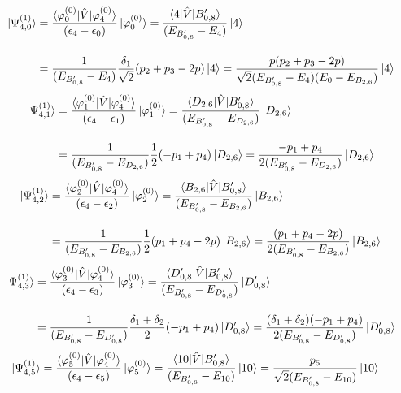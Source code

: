 \begin{align}
    \ket{\Psi_{4,0}^{(1)}}
     &=\frac{\braket{\varphi_{0
     }^{(0)}|\hat{V}|\varphi_{4}^{(0)}}}{(\epsilon_{4}-\epsilon_{0})}\ket{\varphi_{0}^{(0)}}
     =\frac{\braket{4|\hat{V}|B_{0,8}^{\prime}}}{(E_{B_{0,8}^{\prime}}-E_4)}\ket{4}
     \nn[10pt]
     &=
     \frac{1}{(E_{B_{0,8}^{\prime}}-E_4)}
     \frac{\delta_1}{\sqrt{2}}(p_2+p_3-2p)
     \ket{4}
     =
     \frac{p(p_2+p_3-2p)}{\sqrt{2}(E_{B_{0,8}^{\prime}}-E_4)(E_0-E_{B_{2,6}})}
     \ket{4}
\end{align}
\begin{align}
     \ket{\Psi_{4,1}^{(1)}}
     &=
     \frac{\braket{\varphi_{1
     }^{(0)}|\hat{V}|\varphi_{4}^{(0)}}}{(\epsilon_{4}-\epsilon_{1})}\ket{\varphi_{1}^{(0)}}
      =\frac{\braket{D_{2,6}|\hat{V}|B_{0,8}^{\prime}}}{(E_{B_{0,8}^{\prime}}-E_{D_{2,6}})}\ket{D_{2,6}}\nn[10pt]
      &=\frac{1}{(E_{B_{0,8}^{\prime}}-E_{D_{2,6}})}
      \frac{1}{2}(-p_1+p_4)
      \ket{D_{2,6}}
      =\frac{-p_1+p_4}{2(E_{B_{0,8}^{\prime}}-E_{D_{2,6}})}
      \ket{D_{2,6}}
\end{align}
\begin{align}
     \ket{\Psi_{4,2}^{(1)}}
     &=
     \frac{\braket{\varphi_{2
     }^{(0)}|\hat{V}|\varphi_{4}^{(0)}}}{(\epsilon_{4}-\epsilon_{2})}\ket{\varphi_{2}^{(0)}}
      =\frac{\braket{B_{2,6}|\hat{V}|B_{0,8}^{\prime}}}{(E_{B_{0,8}^{\prime}}-E_{B_{2,6}})}\ket{B_{2,6}}\nn[10pt]
      &=\frac{1}{(E_{B_{0,8}^{\prime}}-E_{B_{2,6}})}
      \frac{1}{2}(p_1+p_4-2p)
      \ket{B_{2,6}}
      =\frac{(p_1+p_4-2p)}{2(E_{B_{0,8}^{\prime}}-E_{B_{2,6}})}
      \ket{B_{2,6}}
\end{align}
\begin{align}
     \ket{\Psi_{4,3}^{(1)}}
     &=
     \frac{\braket{\varphi_{3
     }^{(0)}|\hat{V}|\varphi_{4}^{(0)}}}{(\epsilon_{4}-\epsilon_{3})}\ket{\varphi_{3}^{(0)}}
      =\frac{\braket{D_{0,8}^{\prime}|\hat{V}|B_{0,8}^{\prime}}}{(E_{B_{0,8}^{\prime}}-E_{D_{0,8}^{\prime}})}\ket{D_{0,8}^{\prime}}\nn[10pt]
      &=\frac{1}{(E_{B_{0,8}^{\prime}}-E_{D_{0,8}^{\prime}})}
      \frac{\delta_1+\delta_2}{2}(-p_1+p_4)\ket{D_{0,8}^{\prime}}
      =\frac{(\delta_1+\delta_2)(-p_1+p_4)}
      {2(E_{B_{0,8}^{\prime}}-E_{D_{0,8}^{\prime}})}
      \ket{D_{0,8}^{\prime}}
\end{align}
\begin{align}
     \ket{\Psi_{4,5}^{(1)}}
     &=
     \frac{\braket{\varphi_{5
     }^{(0)}|\hat{V}|\varphi_{4}^{(0)}}}{(\epsilon_{4}-\epsilon_{5})}\ket{\varphi_{5}^{(0)}}
      =\frac{\braket{10|\hat{V}|B_{0,8}^{\prime}}}{(E_{B_{0,8}^{\prime}}-E_{10})}\ket{10}
      =\frac{p_5}{\sqrt{2}(E_{B_{0,8}^{\prime}}-E_{10})}\ket{10}
\end{align}
